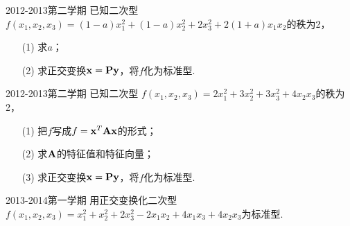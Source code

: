 \begin{frame}
   \begin{footnotesize}

    \begin{exampleblock}{2012-2013第二学期}
      已知二次型
      $
      f(x_1,x_2,x_3)=(1-a)x_1^2+(1-a)x_2^2+2x_3^2+2(1+a)x_1x_2 
      $的秩为2，
\begin{itemize}
\item[(1)] 求$a$；
\item[(2)] 求正交变换$\mathbf{x}=\mathbf{P}\mathbf{y}$，将$f$化为标准型.
\end{itemize}      
    \end{exampleblock}

   \begin{exampleblock}{2012-2013第二学期}
已知二次型
      $
      f(x_1,x_2,x_3)=2x_1^2+3x_2^2+3x_3^2+4x_2x_3 
      $的秩为2，
\begin{itemize}
\item[(1)] 把$f$写成$f=\mathbf{x}^T\mathbf{A}\mathbf{x}$的形式；
\item[(2)] 求$\mathbf{A}$的特征值和特征向量；
\item[(3)] 求正交变换$\mathbf{x}=\mathbf{P}\mathbf{y}$，将$f$化为标准型.
\end{itemize}      
    \end{exampleblock}
  \end{footnotesize}
\end{frame}

\begin{frame}
   \begin{footnotesize}

    \begin{exampleblock}{2013-2014第一学期}
      用正交变换化二次型
      $
      f(x_1,x_2,x_3)=x_1^2+x_2^2+2x_3^2-2x_1x_2+4x_1x_3+4x_2x_3$为标准型.
    \end{exampleblock}

  
  \end{footnotesize}
\end{frame}






